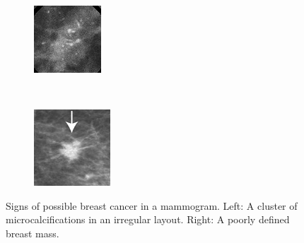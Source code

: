 \begin{figure}[h]
	\centering
	\begin{subfigure}{0.25\textwidth}
                \includegraphics[width=\textwidth]{plots/breastMicrocalcification.png}
        \end{subfigure}
	~
	\begin{subfigure}{0.25\textwidth}
                \includegraphics[width=\textwidth]{plots/breastMass.png}
        \end{subfigure}
	\caption[Breast Cancer Signs]{Signs of possible breast cancer in a mammogram. Left: A cluster of microcalcifications in an irregular layout. Right: A poorly defined breast mass.}
	\label{fig:breastCancerSigns}
\end{figure}


